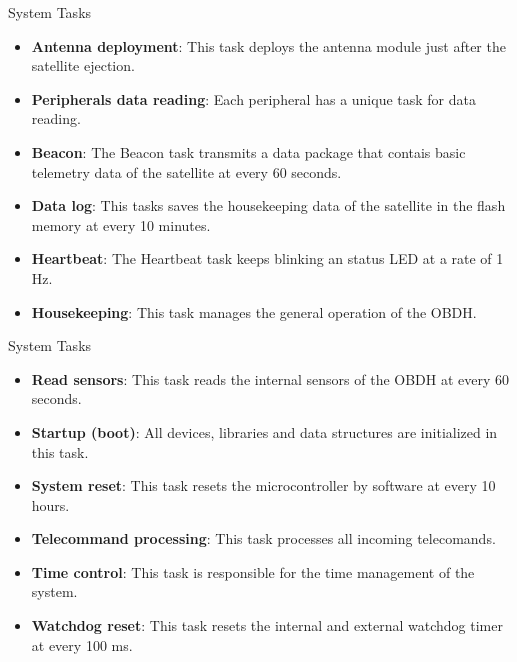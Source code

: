 \begin{frame}{System Tasks}

    \begin{itemize}
        \item \textbf{Antenna deployment}: This task deploys the antenna module just after the satellite ejection.
        \item \textbf{Peripherals data reading}: Each peripheral has a unique task for data reading.
        \item \textbf{Beacon}: The Beacon task transmits a data package that contais basic telemetry data of the satellite at every 60 seconds.
        \item \textbf{Data log}: This tasks saves the housekeeping data of the satellite in the flash memory at every 10 minutes.
        \item \textbf{Heartbeat}: The Heartbeat task keeps blinking an status LED at a rate of 1 Hz.
        \item \textbf{Housekeeping}: This task manages the general operation of the OBDH.
    \end{itemize}

\end{frame}

\begin{frame}{System Tasks}

    \begin{itemize}
        \item \textbf{Read sensors}: This task reads the internal sensors of the OBDH at every 60 seconds.
        \item \textbf{Startup (boot)}: All devices, libraries and data structures are initialized in this task.
        \item \textbf{System reset}: This task resets the microcontroller by software at every 10 hours.
        \item \textbf{Telecommand processing}: This task processes all incoming telecomands. 
        \item \textbf{Time control}: This task is responsible for the time management of the system.
        \item \textbf{Watchdog reset}: This task resets the internal and external watchdog timer at every 100 ms.
    \end{itemize}

\end{frame}



